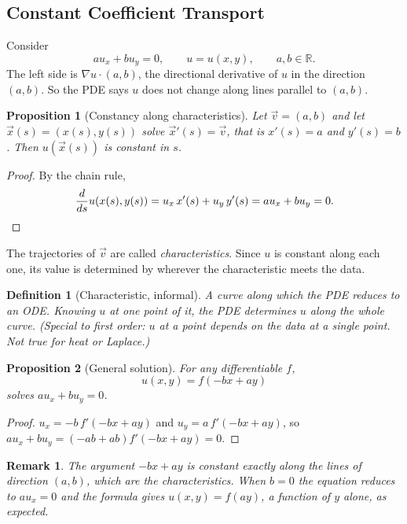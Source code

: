 \documentclass{article}
\newtheorem{definition}{Definition}
\newtheorem{remark}{Remark}
\newtheorem{proposition}{Proposition}
\begin{document}
\subsection{Constant Coefficient Transport}
Consider
\begin{equation}
    a u_x + b u_y = 0, \qquad u = u(x,y), \qquad a, b \in \mathbb{R}.
\end{equation}
The left side is $\nabla u \cdot (a,b)$, the directional derivative of $u$ in the direction $(a,b)$. So the PDE says $u$ does not change along lines parallel to $(a,b)$.
\begin{proposition}[Constancy along characteristics]
    Let $\vec{v} = (a,b)$ and let $\vec{x}(s) = (x(s), y(s))$ solve $\vec{x}'(s) = \vec{v}$, that is $x'(s) = a$ and $y'(s) = b$. Then $u(\vec{x}(s))$ is constant in $s$.
\end{proposition}
\begin{proof}
    By the chain rule,
    \begin{equation}
        \frac{d}{ds} u(x(s), y(s)) = u_x\, x'(s) + u_y\, y'(s) = a u_x + b u_y = 0. \qedhere
    \end{equation}
\end{proof}
The trajectories of $\vec{v}$ are called \emph{characteristics}. Since $u$ is constant along each one, its value is determined by wherever the characteristic meets the data.
\begin{definition}[Characteristic, informal]
    A curve along which the PDE reduces to an ODE. Knowing $u$ at one point of it, the PDE determines $u$ along the whole curve. (Special to first order: $u$ at a point depends on the data at a single point. Not true for heat or Laplace.)
\end{definition}
\begin{proposition}[General solution]
    For any differentiable $f$,
    \begin{equation}
        u(x,y) = f(-bx + ay)
    \end{equation}
    solves $a u_x + b u_y = 0$.
\end{proposition}
\begin{proof}
    $u_x = -b\, f'(-bx+ay)$ and $u_y = a\, f'(-bx+ay)$, so $a u_x + b u_y = (-ab + ab) f'(-bx+ay) = 0$.
\end{proof}
\begin{remark}
    The argument $-bx + ay$ is constant exactly along the lines of direction $(a,b)$, which are the characteristics. When $b = 0$ the equation reduces to $a u_x = 0$ and the formula gives $u(x,y) = f(ay)$, a function of $y$ alone, as expected.
\end{remark}
\end{document}
